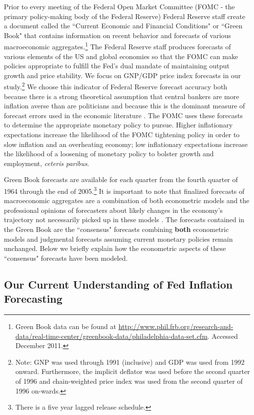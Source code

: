 \documentclass[a4paper]{article}\usepackage{graphicx, color}
\begin{document}
Prior to every meeting of the Federal Open Market Committee (FOMC - the primary policy-making body of the Federal Reserve) Federal Reserve staff create a document called the ``Current Economic and Financial Conditions" or ``Green Book" that contains information on recent behavior and forecasts of various macroeconomic aggregates.\footnote{Green Book data can be found at {\url{http://www.phil.frb.org/research-and-data/real-time-center/greenbook-data/philadelphia-data-set.cfm}}. Accessed December 2011.} The Federal Reserve staff produces forecasts of various elements of the US and global economies so that the FOMC can make policies appropriate to fulfill the Fed's dual mandate of maintaining output growth and price stability. We focus on GNP/GDP price index forecasts in our study.\footnote{Note: GNP was used through 1991 (inclusive) and GDP was used from 1992 onward. Furthermore, the implicit deflator was used before the second quarter of 1996 and chain-weighted price index was used from the second quarter of 1996 on-wards.} We choose this indicator of Federal Reserve forecast accuracy both because there is a strong theoretical assumption that central bankers are more inflation averse than are politicians \citep{Cukierman1992} and because this is the dominant measure of forecast errors used in the economic literature \citep[c.f.][]{Romer2000}. The FOMC uses these forecasts to determine the appropriate monetary policy to pursue. Higher inflationary expectations increase the likelihood of the FOMC tightening policy in order to slow inflation and an overheating economy; low inflationary expectations increase the likelihood of a loosening of monetary policy to bolster growth and employment, \emph{ceteris paribus}.

Green Book forecasts are available for each quarter from the fourth quarter of 1964 through the end of 2005.\footnote{There is a five year lagged release schedule.} It is important to note that finalized forecasts of macroeconomic aggregates are a combination of both econometric models and the professional opinions of forecasters about likely changes in the economy's trajectory not necessarily picked up in these models \citep{Karamouzis1989,Reifschneider1997}. The forecasts contained in the Green Book are the ``consensus" forecasts combining {\bf{both}} econometric models and judgmental forecasts assuming current monetary policies remain unchanged. Below we briefly explain how the econometric aspects of these ``consensus" forecasts have been modeled.

\subsection{Our Current Understanding of Fed Inflation Forecasting}
\end{document}
